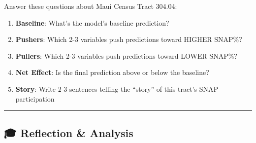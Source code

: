 \documentclass[
  letterpaper,
  DIV=11,
  numbers=noendperiod]{scrartcl}
\providecommand{\tightlist}{%
  \setlength{\itemsep}{0pt}\setlength{\parskip}{0pt}}\usepackage{longtable,booktabs,array}
\begin{document}
\begin{tcolorbox}[enhanced jigsaw, title=\textcolor{quarto-callout-note-color}{\faInfo}\hspace{0.5em}{🔍 Case Study Analysis}, titlerule=0mm, coltitle=black, colbacktitle=quarto-callout-note-color!10!white, colback=white, left=2mm, toprule=.15mm, opacitybacktitle=0.6, toptitle=1mm, colframe=quarto-callout-note-color-frame, bottomtitle=1mm, arc=.35mm, bottomrule=.15mm, breakable, leftrule=.75mm, opacityback=0, rightrule=.15mm]

Answer these questions about Maui Census Tract 304.04:

\begin{enumerate}
\def\labelenumi{\arabic{enumi}.}
\tightlist
\item
  \textbf{Baseline}: What's the model's baseline prediction?
\item
  \textbf{Pushers}: Which 2-3 variables push predictions toward HIGHER
  SNAP\%?
\item
  \textbf{Pullers}: Which 2-3 variables push predictions toward LOWER
  SNAP\%?
\item
  \textbf{Net Effect}: Is the final prediction above or below the
  baseline?
\item
  \textbf{Story}: Write 2-3 sentences telling the ``story'' of this
  tract's SNAP participation
\end{enumerate}

\end{tcolorbox}

\begin{center}\rule{0.5\linewidth}{0.5pt}\end{center}

\subsection{🎓 Reflection \& Analysis}\label{reflection-analysis}
\end{document}
